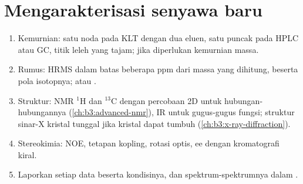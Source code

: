 \section{Mengarakterisasi senyawa baru}

\begin{method}\label{met:b3:lab-techniques-3:characterise}
\begin{enumerate}
  \item Kemurnian: satu noda pada KLT dengan dua eluen, satu puncak pada HPLC atau GC, titik
        leleh yang tajam;  jika diperlukan kemurnian massa.
  \item Rumus: HRMS dalam batas beberapa ppm dari massa yang dihitung, beserta pola
        isotopnya; atau .
  \item Struktur: NMR $^1$H dan $^{13}$C dengan percobaan 2D untuk hubungan-hubungannya
        (\cref{ch:b3:advanced-nmr}), IR untuk gugus-gugus fungsi; struktur sinar-X
        kristal tunggal jika kristal dapat tumbuh (\cref{ch:b3:x-ray-diffraction}).
  \item Stereokimia: NOE, tetapan kopling, rotasi optis, ee dengan kromatografi
        kiral.
  \item Laporkan setiap data beserta kondisinya, dan spektrum-spektrumnya dalam .
\end{enumerate}
\end{method}

